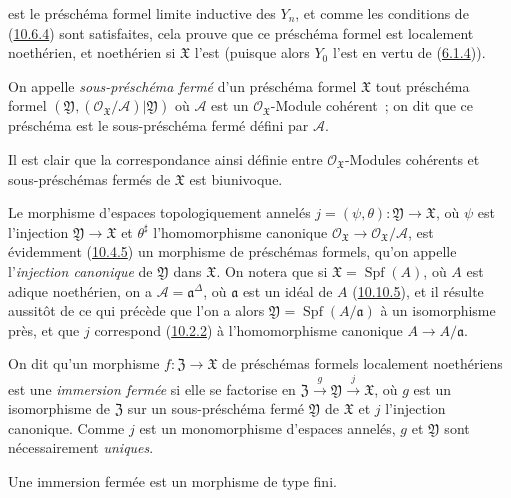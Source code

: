 est le préschéma formel limite inductive des $Y_n$, et comme les conditions de
(\hyperref[I.10.6.4-fr]{10.6.4}) sont satisfaites, cela prouve que ce préschéma
formel est localement noethérien, et noethérien si $\mathfrak{X}$ l'est (puisque
alors $Y_0$ l'est en vertu de (\hyperref[I.6.1.4-fr]{6.1.4})).

\begin{definition}[10.14.2]
\label{I.10.14.2-fr}
On appelle \emph{sous-préschéma fermé} d'un préschéma formel $\mathfrak{X}$ tout
préschéma formel
$(\mathfrak{Y},(\mathscr{O}_{\mathfrak{X}}/\mathscr{A})|\mathfrak{Y})$ où
$\mathscr{A}$ est un $\mathscr{O}_{\mathfrak{X}}$-Module cohérent~; on dit que ce
préschéma est le sous-préschéma fermé défini par $\mathscr{A}$.
\end{definition}

Il est clair que la correspondance ainsi définie entre
$\mathscr{O}_{\mathfrak{X}}$-Modules cohérents et sous-préschémas fermés de
$\mathfrak{X}$ est biunivoque.

Le morphisme d'espaces topologiquement annelés
$j=(\psi,\theta):\mathfrak{Y}\to\mathfrak{X}$, où $\psi$ est l'injection
$\mathfrak{Y}\to\mathfrak{X}$ et $\theta^\sharp$ l'homomorphisme canonique
$\mathscr{O}_{\mathfrak{X}}\to\mathscr{O}_{\mathfrak{X}}/\mathscr{A}$, est
évidemment (\hyperref[I.10.4.5-fr]{10.4.5}) un morphisme de préschémas formels,
qu'on appelle l'\emph{injection canonique} de $\mathfrak{Y}$ dans $\mathfrak{X}$.
On notera que si $\mathfrak{X}=\operatorname{Spf}(A)$, où $A$ est adique
noethérien, on a $\mathscr{A}=\mathfrak{a}^\Delta$, où $\mathfrak{a}$ est un
idéal de $A$ (\hyperref[I.10.10.5-fr]{10.10.5}), et il résulte aussitôt de ce
qui précède que l'on a alors
$\mathfrak{Y}=\operatorname{Spf}(A/\mathfrak{a})$ à un isomorphisme près, et que
$j$ correspond (\hyperref[I.10.2.2-fr]{10.2.2}) à l'homomorphisme canonique
$A\to A/\mathfrak{a}$.

On dit qu'un morphisme $f:\mathfrak{Z}\to\mathfrak{X}$ de préschémas formels
localement noethériens est une \emph{immersion fermée} si elle se factorise en
$\mathfrak{Z}\xrightarrow{g}\mathfrak{Y}\xrightarrow{j}\mathfrak{X}$, où $g$
est un isomorphisme de $\mathfrak{Z}$ sur un sous-préschéma fermé
$\mathfrak{Y}$ de $\mathfrak{X}$ et $j$ l'injection canonique. Comme $j$ est un
monomorphisme d'espaces annelés, $g$ et $\mathfrak{Y}$ sont nécessairement
\emph{uniques}.

\begin{proposition}[10.14.3]
\label{I.10.14.3-fr}
Une immersion fermée est un morphisme de type fini.
\end{proposition}

